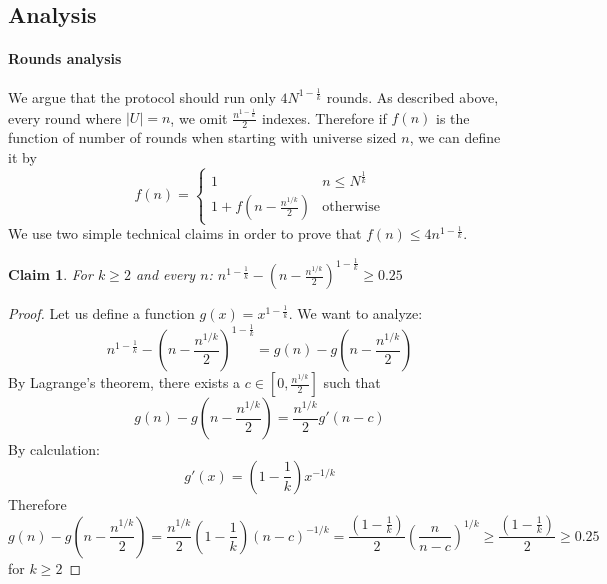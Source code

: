 \documentclass{article}
\theoremstyle{plain}
\newtheorem{claim}{Claim}
\begin{document}
\subsection{Analysis}
\paragraph{Rounds analysis}
We argue that the protocol should run only $4N^{1-\frac{1}{k}}$ rounds. As described above, every round where $|U| = n$, we omit $\frac{n^{1-\frac{1}{k}}}{2}$ indexes. Therefore if $f(n)$ is the function of number of rounds when starting with universe sized $n$, we can define it by
    \begin{equation*}
        f(n) = \begin{cases}
               1               & n \leq N^{\frac{1}{k}}\\
               1 + f(n - \frac{n^{1/k}}{2}) & \text{otherwise}
           \end{cases}
    \end{equation*}
We use two simple technical claims in order to prove that $f(n) \leq 4n^{1-\frac{1}{k}}$.
\begin{claim}
    For $k \geq 2$ and every $n$: $n^{1 - \frac{1}{k}} - \left(n-\frac{n^{1/k}}{2}\right)^{1-\frac{1}{k}} \geq 0.25$
\end{claim}
\begin{proof}
    Let us define a function $g(x) = x^{1-\frac{1}{k}}$. We want to analyze:
    \begin{equation*}
        n^{1 - \frac{1}{k}} - \left(n-\frac{n^{1/k}}{2}\right)^{1-\frac{1}{k}} = g(n) - g\left (n-\frac{n^{1/k}}{2}\right)
    \end{equation*}
    By Lagrange's theorem, there exists a $c \in [0, \frac{n^{1/k}}{2}]$ such that
    \begin{equation*}
        g(n) - g\left( n-\frac{n^{1/k}}{2}\right) = \frac{n^{1/k}}{2} g'(n-c)
    \end{equation*}
    By calculation: 
    \begin{equation*}
        g'(x) = \left(1-\frac{1}{k}\right)x^{-1/k}
    \end{equation*}
    Therefore 
    \begin{equation*}
        g(n) - g\left( n-\frac{n^{1/k}}{2}\right) = \frac{n^{1/k}}{2} \left(1-\frac{1}{k}\right) (n-c)^{-1/k} = \frac{(1-\frac{1}{k})}{2} \left(\frac{n}{n-c}\right)^{1/k} \geq \frac{(1-\frac{1}{k})}{2} \geq 0.25
    \end{equation*}
    for $k \geq 2$ 
\end{proof}
\end{document}
